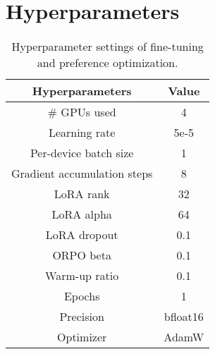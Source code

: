 \clearpage

\section{Hyperparameters}
\label{sec:hyperparameters}

\begin{table}[ht]
\centering
\begin{tabular}{c c}
\toprule
\textbf{Hyperparameters}        & \textbf{Value} \\
\midrule
\# GPUs used                    & 4                \\
Learning rate                   & 5e-5             \\
Per-device batch size           & 1                \\
Gradient accumulation steps     & 8                \\
LoRA rank                       & 32               \\
LoRA alpha                      & 64               \\
LoRA dropout                    & 0.1              \\
ORPO beta                       & 0.1              \\
Warm-up ratio                   & 0.1              \\
Epochs                          & 1                \\
Precision                       & bfloat16         \\
Optimizer                       & AdamW            \\
\bottomrule
\end{tabular}
\caption{Hyperparameter settings of fine-tuning and preference optimization.}
\label{tab:hyperparameters}
\end{table}

